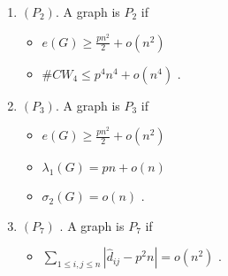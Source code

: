 \begin{definition}
	\begin{enumerate}
		\item \(\left( P_2 \right) \). A graph is \(P_2\) if
			\begin{itemize}
				\item \(e\left( G \right) \ge \frac{pn^2}{2} + o\left( n^2 \right) \)
				\item \(\# CW_4 \le p^{4} n^{4} + o\left( n^{4} \right) \) .
			\end{itemize}
		\item \(\left( P_3 \right) \). A graph is \(P_3\) if
			\begin{itemize}
				\item \(e\left( G \right)  \ge \frac{pn^2}{2} + o\left( n^2 \right) \)
				\item \(\lambda_1 \left( G \right)  = pn + o\left( n \right) \)
				\item \(\sigma_2\left( G \right)  = o\left( n \right) \) .
			\end{itemize}
		\item \(\left( P_7 \right) \) . A graph is \(P_7\)  if
			\begin{itemize}
				\item \(\sum_{1 \le i , j \le n}^{} \left| \hat{d}_{ij} - p^2n \right| = o\left( n^2 \right) \) .
			\end{itemize}
	\end{enumerate}
\end{definition}
